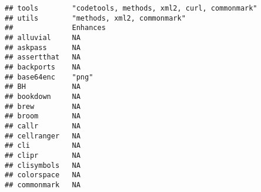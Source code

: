 \documentclass[]{book}
\begin{document}
\begin{verbatim}
## tools        "codetools, methods, xml2, curl, commonmark"                                                                                                                                                                                                                                                                                                                                                                                                                                                                                                                                                                                                                                                              
## utils        "methods, xml2, commonmark"                                                                                                                                                                                                                                                                                                                                                                                                                                                                                                                                                                                                                                                                               
##              Enhances                                                  
## alluvial     NA                                                        
## askpass      NA                                                        
## assertthat   NA                                                        
## backports    NA                                                        
## base64enc    "png"                                                     
## BH           NA                                                        
## bookdown     NA                                                        
## brew         NA                                                        
## broom        NA                                                        
## callr        NA                                                        
## cellranger   NA                                                        
## cli          NA                                                        
## clipr        NA                                                        
## clisymbols   NA                                                        
## colorspace   NA                                                        
## commonmark   NA                                                        

\end{verbatim}
\end{document}
